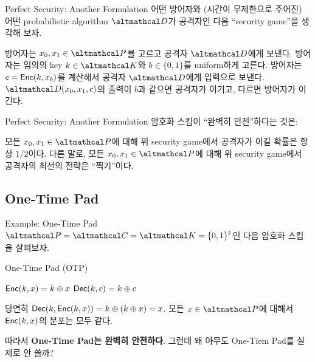 \documentclass[../250428_msquare_provable_security.tex]{subfiles}
\begin{document}
\begin{frame}{Perfect Security: Another Formulation}
    어떤 방어자와 (시간이 무제한으로 주어진) 어떤 probabilistic algorithm \(\mcal{D}\)가 공격자인
    다음 ``security game''을 생각해 보자.
    \pause
    \begin{enumerate}
        \ii
        방어자는 \(x_0, x_1 \in \mcal{P}\)를 고르고 공격자 \(\mcal{D}\)에게 보낸다.
        \ii
        방어자는 임의의 key \(k \in \mcal{K}\)와 \(b \in \{0,1\}\)를 uniform하게 고른다.
        \pause
        \ii
        방어자는 \(c = \mathsf{Enc}(k, x_b)\)를 계산해서 공격자 \(\mcal{D}\)에게 입력으로 보낸다.
        \pause
        \ii
        \(\mcal{D}(x_0, x_1, c)\)의 출력이 \(b\)과 같으면 공격자가 이기고, 다르면 방어자가 이긴다.
    \end{enumerate}
    \pause

    \begin{block}{Perfect Security: Another Formulation}
        암호화 스킴이 ``완벽히 안전''하다는 것은:
        \begin{itemize}
            \ii
            모든 \(x_0, x_1 \in \mcal{P}\)에 대해
            위 security game에서 공격자가 이길 확률은 항상 \(1/2\)이다.
            \pause
            \ii
            다른 말로, 모든 \(x_0, x_1 \in \mcal{P}\)에 대해
            위 security game에서 공격자의 최선의 전략은 ``찍기''이다.
        \end{itemize}
    \end{block}
\end{frame}

\subsection{One-Time Pad}
\begin{frame}{Example: One-Time Pad}
    \(\mcal{P} = \mcal{C} = \mcal{K} = \{0,1\}^\ell\)인 다음 암호화 스킴을 살펴보자.
    \pause
    \begin{block}{One-Time Pad (OTP)}
        \begin{itemize}
            \ii
            \(\mathsf{Enc}(k, x) = k \oplus x\)
            \ii
            \(\mathsf{Dec}(k, c) = k \oplus c\)
        \end{itemize}
    \end{block}

    \pause
    \begin{itemize}
        \ii
        당연히 \(\mathsf{Dec}(k, \mathsf{Enc}(k, x)) = k \oplus (k \oplus x) = x\).
        \pause
        \ii
        모든 \(x \in \mcal{P}\)에 대해서 \(\mathsf{Enc}(k, x)\)의 분포는 모두 같다.
    \end{itemize}
    \pause
    따라서 \textbf{One-Time Pad는 완벽히 안전하다}.
    \pause
    그런데 왜 아무도 One-Tiem Pad를 실제로 안 쓸까?
\end{frame}
\end{document}
